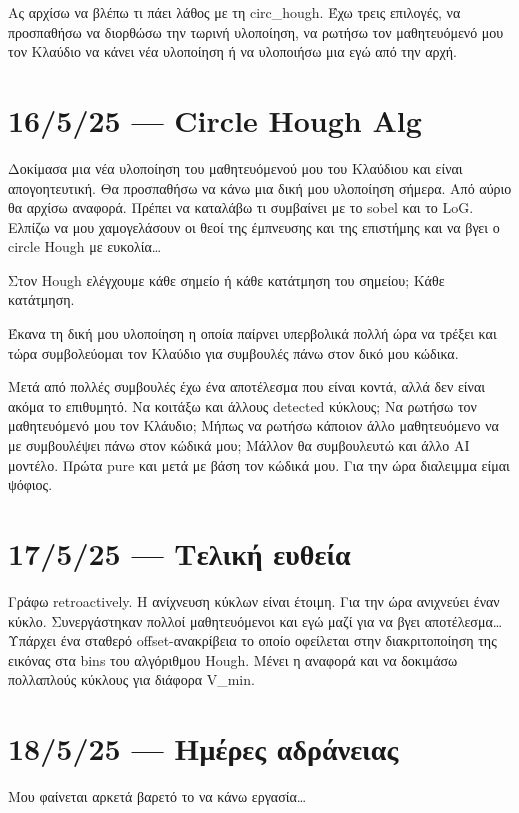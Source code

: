 \documentclass{article}
\begin{document}
Ας αρχίσω να βλέπω 
τι πάει λάθος με τη circ\_hough. Έχω τρεις επιλογές, να προσπαθήσω να διορθώσω
την τωρινή υλοποίηση, να ρωτήσω τον μαθητευόμενό μου τον Κλαύδιο να κάνει
νέα υλοποίηση ή να υλοποιήσω μια εγώ από την αρχή.

\section{16/5/25 --- Circle Hough Alg}
Δοκίμασα μια νέα υλοποίηση του μαθητευόμενού μου του Κλαύδιου και είναι
απογοητευτική. Θα προσπαθήσω να κάνω μια δική μου υλοποίηση σήμερα.
Από αύριο θα αρχίσω αναφορά. Πρέπει να καταλάβω τι συμβαίνει με το sobel
και το LoG. Ελπίζω να μου χαμογελάσουν οι θεοί της έμπνευσης και της επιστήμης
και να βγει ο circle Hough με ευκολία\ldots{} 

Στον Hough ελέγχουμε κάθε σημείο ή κάθε κατάτμηση του σημείου; Κάθε κατάτμηση.

Έκανα τη δική μου υλοποίηση η οποία παίρνει υπερβολικά πολλή ώρα να τρέξει
και τώρα συμβολεύομαι τον Κλαύδιο για συμβουλές πάνω στον δικό μου κώδικα.

Μετά από πολλές συμβουλές έχω ένα αποτέλεσμα που είναι κοντά, αλλά δεν είναι
ακόμα το επιθυμητό. Να κοιτάξω και άλλους detected κύκλους; Να ρωτήσω τον
μαθητευόμενό μου τον Κλάυδιο; Μήπως να ρωτήσω κάποιον άλλο μαθητευόμενο 
να με συμβουλέψει πάνω στον κώδικά μου; Μάλλον θα συμβουλευτώ και άλλο 
AI μοντέλο. Πρώτα pure και μετά με βάση τον κώδικά μου. Για την ώρα διαλειμμα
είμαι ψόφιος.

\section{17/5/25 --- Τελική ευθεία}
Γράφω retroactively. Η ανίχνευση κύκλων είναι έτοιμη. Για την ώρα ανιχνεύει 
έναν κύκλο. Συνεργάστηκαν πολλοί μαθητευόμενοι και εγώ μαζί για να βγει
αποτέλεσμα\ldots{} Υπάρχει ένα σταθερό offset-ανακρίβεια το οποίο οφείλεται 
στην διακριτοποίηση της εικόνας στα bins του αλγόριθμου Hough. Μένει η αναφορά
και να δοκιμάσω πολλαπλούς κύκλους για διάφορα V\_min.

\section{18/5/25 --- Ημέρες αδράνειας}
Μου φαίνεται αρκετά βαρετό το να κάνω εργασία\ldots{}
\end{document}
